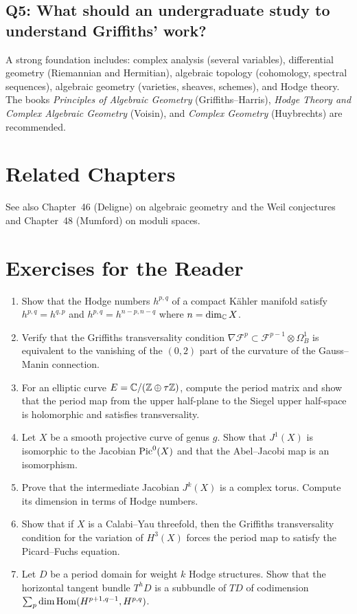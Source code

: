 \subsection*{Q5: What should an undergraduate study to understand Griffiths' work?}
A strong foundation includes: complex analysis (several variables), differential geometry (Riemannian and Hermitian), algebraic topology (cohomology, spectral sequences), algebraic geometry (varieties, sheaves, schemes), and Hodge theory. The books \textit{Principles of Algebraic Geometry} (Griffiths--Harris), \textit{Hodge Theory and Complex Algebraic Geometry} (Voisin), and \textit{Complex Geometry} (Huybrechts) are recommended.

\section{Related Chapters}
See also Chapter~46 (Deligne) on algebraic geometry and the Weil conjectures and Chapter~48 (Mumford) on moduli spaces.

\section*{Exercises for the Reader}

\begin{enumerate}
    \item [B] Show that the Hodge numbers $h^{p,q}$ of a compact K\"ahler manifold satisfy $h^{p,q} = h^{q,p}$ and $h^{p,q} = h^{n-p,n-q}$ where $n = \dim_{\mathbb{C}} X$.
    \item [I] Verify that the Griffiths transversality condition $\nabla \mathcal{F}^p \subset \mathcal{F}^{p-1} \otimes \Omega_B^1$ is equivalent to the vanishing of the $(0,2)$ part of the curvature of the Gauss--Manin connection.
    \item [I] For an elliptic curve $E = \mathbb{C} / (\mathbb{Z} \oplus \tau \mathbb{Z})$, compute the period matrix and show that the period map from the upper half-plane to the Siegel upper half-space is holomorphic and satisfies transversality.
    \item [B] Let $X$ be a smooth projective curve of genus $g$. Show that $J^1(X)$ is isomorphic to the Jacobian $\operatorname{Pic}^0(X)$ and that the Abel--Jacobi map is an isomorphism.
    \item [I] Prove that the intermediate Jacobian $J^k(X)$ is a complex torus. Compute its dimension in terms of Hodge numbers.
    \item [I] Show that if $X$ is a Calabi--Yau threefold, then the Griffiths transversality condition for the variation of $H^3(X)$ forces the period map to satisfy the Picard--Fuchs equation.
    \item [I] Let $D$ be a period domain for weight $k$ Hodge structures. Show that the horizontal tangent bundle $T^h D$ is a subbundle of $T D$ of codimension $\sum_{p} \dim \operatorname{Hom}(H^{p+1,q-1}, H^{p,q})$.
\end{enumerate}

